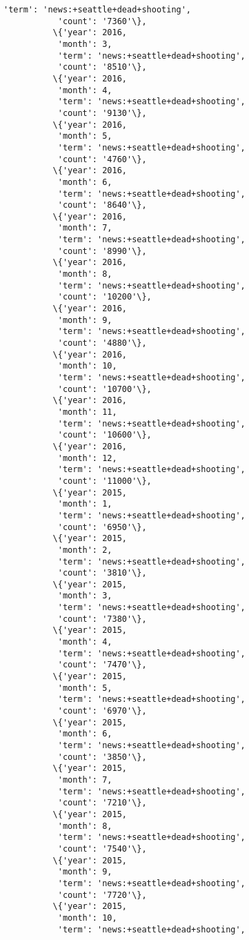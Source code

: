 \documentclass[11pt]{article}
\begin{document}
\begin{Verbatim}[commandchars=\\\{\}]
           'term': 'news:+seattle+dead+shooting',
           'count': '7360'\},
          \{'year': 2016,
           'month': 3,
           'term': 'news:+seattle+dead+shooting',
           'count': '8510'\},
          \{'year': 2016,
           'month': 4,
           'term': 'news:+seattle+dead+shooting',
           'count': '9130'\},
          \{'year': 2016,
           'month': 5,
           'term': 'news:+seattle+dead+shooting',
           'count': '4760'\},
          \{'year': 2016,
           'month': 6,
           'term': 'news:+seattle+dead+shooting',
           'count': '8640'\},
          \{'year': 2016,
           'month': 7,
           'term': 'news:+seattle+dead+shooting',
           'count': '8990'\},
          \{'year': 2016,
           'month': 8,
           'term': 'news:+seattle+dead+shooting',
           'count': '10200'\},
          \{'year': 2016,
           'month': 9,
           'term': 'news:+seattle+dead+shooting',
           'count': '4880'\},
          \{'year': 2016,
           'month': 10,
           'term': 'news:+seattle+dead+shooting',
           'count': '10700'\},
          \{'year': 2016,
           'month': 11,
           'term': 'news:+seattle+dead+shooting',
           'count': '10600'\},
          \{'year': 2016,
           'month': 12,
           'term': 'news:+seattle+dead+shooting',
           'count': '11000'\},
          \{'year': 2015,
           'month': 1,
           'term': 'news:+seattle+dead+shooting',
           'count': '6950'\},
          \{'year': 2015,
           'month': 2,
           'term': 'news:+seattle+dead+shooting',
           'count': '3810'\},
          \{'year': 2015,
           'month': 3,
           'term': 'news:+seattle+dead+shooting',
           'count': '7380'\},
          \{'year': 2015,
           'month': 4,
           'term': 'news:+seattle+dead+shooting',
           'count': '7470'\},
          \{'year': 2015,
           'month': 5,
           'term': 'news:+seattle+dead+shooting',
           'count': '6970'\},
          \{'year': 2015,
           'month': 6,
           'term': 'news:+seattle+dead+shooting',
           'count': '3850'\},
          \{'year': 2015,
           'month': 7,
           'term': 'news:+seattle+dead+shooting',
           'count': '7210'\},
          \{'year': 2015,
           'month': 8,
           'term': 'news:+seattle+dead+shooting',
           'count': '7540'\},
          \{'year': 2015,
           'month': 9,
           'term': 'news:+seattle+dead+shooting',
           'count': '7720'\},
          \{'year': 2015,
           'month': 10,
           'term': 'news:+seattle+dead+shooting',

\end{Verbatim}
\end{document}
